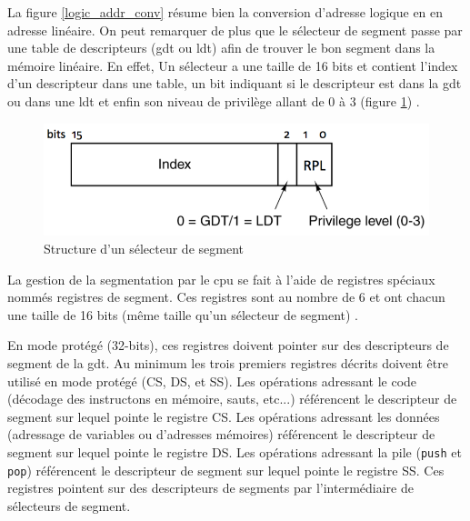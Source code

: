La figure \ref{logic_addr_conv} résume bien la conversion d'adresse logique en
en adresse linéaire. On peut remarquer de plus que le sélecteur de segment passe
par une table de descripteurs (\acrshort{gdt} ou \acrshort{ldt}) afin de trouver
le bon segment dans la mémoire linéaire. En effet, Un sélecteur a une taille de
16 bits et contient l'index d'un descripteur dans une table, un bit indiquant si
le descripteur est dans la \acrshort{gdt} ou dans une \acrshort{ldt} et enfin son
niveau de privilège allant de 0 à 3 (figure \ref{seg_sel}) \cite{ref42}.

\begin{figure}[!h]
  \centering
  \includegraphics[scale=0.6]{images/seg_sel.png}
  \caption{Structure d'un sélecteur de segment}
  \label{seg_sel}
\end{figure}

La gestion de la segmentation par le \acrshort{cpu} se fait à l'aide de registres
spéciaux nommés registres de segment. Ces registres sont au nombre de 6 et ont
chacun une taille de 16 bits (même taille qu'un sélecteur de segment) \cite{ref42,ref18}.

\begin{center}
\end{center}

En mode protégé (32-bits), ces registres doivent pointer sur des descripteurs
de segment de la \acrshort{gdt}. Au minimum les trois premiers registres décrits
doivent être utilisé en mode protégé (CS, DS, et SS). Les opérations adressant
le code (décodage des instructons en mémoire, sauts, etc...) référencent le descripteur
de segment sur lequel pointe le registre CS. Les opérations adressant les données
(adressage de variables ou d'adresses mémoires) référencent le descripteur de segment
sur lequel pointe le registre DS. Les opérations adressant la pile (\texttt{push}
et \texttt{pop}) référencent le descripteur de segment sur lequel pointe
le registre SS. Ces registres pointent sur des descripteurs de segments par l'intermédiaire
de sélecteurs de segment. \\

